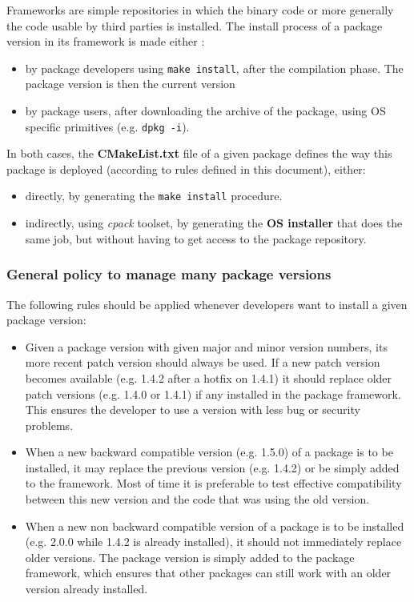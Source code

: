 \documentclass[12pt,a4paper]{article}
\begin{document}
Frameworks are simple repositories in which the binary code or more generally the code usable by third parties is installed. The install process of a package  version in its framework is made either :
\begin{itemize}
\item by package developers using \texttt{make install}, after the compilation phase. The package version is then the current version
\item by package users, after downloading the archive of the package, using OS specific primitives (e.g. \texttt{dpkg -i}).
\end{itemize}
In both cases, the \textbf{CMakeList.txt} file of a given package defines the way this package is deployed (according to rules defined in this document), either:
\begin{itemize}
\item directly, by generating the \texttt{make install} procedure.
\item indirectly, using \textit{cpack} toolset, by generating the \textbf{OS installer} that does the same job, but without having to get access to the package repository.
\end{itemize}


\subsubsection{General policy to manage many package versions}

The following rules should be applied whenever developers want to install a given package version:
\begin{itemize}
\item Given a package version with given major and minor version numbers, its more recent patch version should always be used. If a new patch version becomes available (e.g. 1.4.2 after a hotfix on 1.4.1) it should replace older patch versions (e.g. 1.4.0 or 1.4.1) if any installed in the package framework. This ensures the developer to use a version with less bug or security problems.
\item When a new backward compatible version (e.g. 1.5.0) of a package is to be installed, it may replace the previous version (e.g. 1.4.2) or be simply added to the framework. Most of time it is preferable to test effective compatibility between this new version and the code that was using the old version.
\item When a new non backward compatible version of a package is to be installed (e.g. 2.0.0 while 1.4.2 is already installed), it should not immediately replace older versions. The package version is simply added to the package framework, which ensures that other packages can still work with an older version already installed.
\end{itemize}
\end{document}
